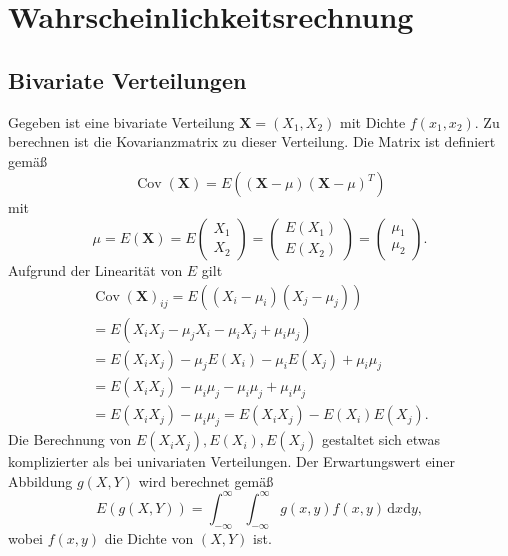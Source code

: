 \documentclass[a4paper,10pt,fleqn,twocolumn,twoside]{scrartcl}
\numberwithin{equation}{section}
\DeclareMathOperator{\Cov}{Cov}
\theoremstyle{rmbox}
\begin{document}
\section{Wahrscheinlichkeitsrechnung}
\subsection{Bivariate Verteilungen}

Gegeben ist eine bivariate Verteilung $\mathbf X=(X_1,X_2)$ mit Dichte
$f(x_1,x_2)$. Zu berechnen ist die Kovarianzmatrix zu dieser
Verteilung. Die Matrix ist definiert gemäß%
\begin{equation}
\Cov(\mathbf X) = E((\mathbf X-\mu)(\mathbf X-\mu)^T)
\end{equation}
mit
\begin{equation}
\mu = E(\mathbf X) = E\begin{pmatrix}X_1\\ X_2\end{pmatrix}
= \begin{pmatrix}
E(X_1)\\ E(X_2)
\end{pmatrix}
= \begin{pmatrix}\mu_1\\ \mu_2\end{pmatrix}.
\end{equation}
Aufgrund der Linearität von $E$ gilt
\begin{gather*}
\Cov(\mathbf X)_{ij} = E((X_i-\mu_i)(X_j-\mu_j))\\
= E(X_i X_j-\mu_j X_i-\mu_i X_j+\mu_i\mu_j)\\
= E(X_i X_j)-\mu_j E(X_i)-\mu_i E(X_j)+\mu_i\mu_j\\
= E(X_i X_j)-\mu_i \mu_j-\mu_i \mu_j+\mu_i\mu_j\\
= E(X_i X_j)-\mu_i\mu_j
= E(X_i X_j)-E(X_i)E(X_j).
\end{gather*}
Die Berechnung von $E(X_i X_j),E(X_i),E(X_j)$ gestaltet
sich etwas komplizierter als bei univariaten Verteilungen.
Der Erwartungswert einer Abbildung $g(X,Y)$ wird berechnet
gemäß%
\begin{equation}\label{eq:E-of-bivariate-map}
E(g(X,Y)) = \int_{-\infty}^\infty\int_{-\infty}^\infty
g(x,y)f(x,y)\,\mathrm dx\mathrm dy,
\end{equation}
wobei $f(x,y)$ die Dichte von $(X,Y)$ ist.
\end{document}
